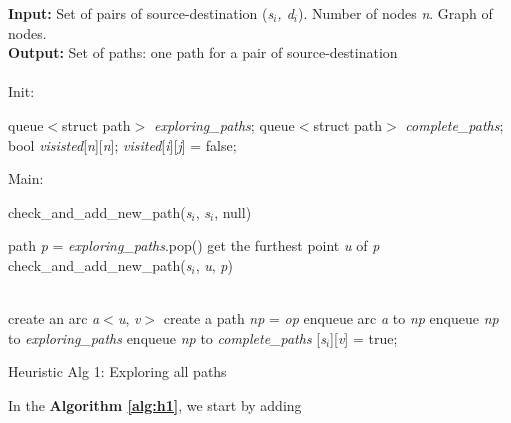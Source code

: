 \begin{algorithm}
\textbf{Input:} Set of pairs of source-destination (\textit{s$_i$, d$_i$}). Number of nodes \textit{n}. Graph of nodes. \\
\textbf{Output:} Set of paths: one path for a pair of source-destination \\
\\
Init:
    \begin{algorithmic}
	\State queue$<$struct path$>$ \textit{exploring\_paths};
	\State queue$<$struct path$>$ \textit{complete\_paths};
	\State bool \textit{visisted}[\textit{n}][\textit{n}];
	    \State \textit{visited}[{\it i}][{\it j}] = false;
	\EndFor
    \end{algorithmic}
Main:

\begin{algorithmic}

	\State check\_and\_add\_new\_path({\it s}$_i$, {\it s}$_i$, null)
    \EndFor

	\State path \textit{p} = \textit{exploring\_paths}.pop()
	\State get the furthest point {\it u} of {\it p}
	\State check\_and\_add\_new\_path({\it s}$_i$, \textit{u}, {\it p})
    \EndWhile

    \EndFunction
\\
		\State create an arc \textit{a}$<$\textit{u}, \textit{v}$>$
                \State create a path \textit{np} = {\it op}
	        \State enqueue arc \textit{a} to \textit{np}
	        \State enqueue \textit{np} to \textit{exploring\_paths}
		    \State enqueue \textit{np} to \textit{complete\_paths}
                \EndIf
	        [\textit{s$_i$}][\textit{v}] = true;
	    \EndIf
	\EndFor
    \EndFunction
\end{algorithmic}

\caption{Heuristic Alg 1: Exploring all paths}
\label{alg:h1}

\end{algorithm}

In the \textbf{Algorithm \ref{alg:h1}}, we start by adding \\

